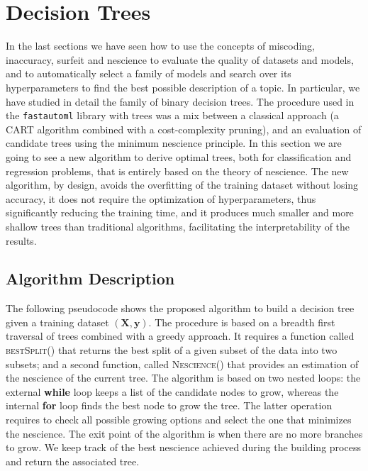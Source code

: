 %
%

\section{Decision Trees}
\label{sec:decision_trees}

In the last sections we have seen how to use the concepts of miscoding, inaccuracy, surfeit and nescience to evaluate the quality of datasets and models, and to automatically select a family of models and search over its hyperparameters to find the best possible description of a topic. In particular, we have studied in detail the family of binary decision trees. The procedure used in the \texttt{fastautoml} library with trees was a mix between a classical approach (a CART algorithm combined with a cost-complexity pruning), and an evaluation of candidate trees using the minimum nescience principle. In this section we are going to see a new algorithm to derive optimal trees, both for classification and regression problems, that is entirely based on the theory of nescience. The new algorithm, by design, avoids the overfitting of the training dataset without losing accuracy, it does not require the optimization of hyperparameters, thus significantly reducing the training time, and it produces much smaller and more shallow trees than traditional algorithms, facilitating the interpretability of the results.

\subsection{Algorithm Description}
\label{sub:tree_algorithm_description}

The following pseudocode shows the proposed algorithm to build a decision tree given a training dataset $(\mathbf{X}, \mathbf{y})$. The procedure is based on a breadth first traversal of trees combined with a greedy approach. It requires a function called \textsc{bestSplit()} that returns the best split of a given subset of the data into two subsets; and a second function, called \textsc{Nescience()} that provides an estimation of the nescience of the current tree. The algorithm is based on two nested loops: the external \textbf{while} loop keeps a list of the candidate nodes to grow, whereas the internal \textbf{for} loop finds the best node to grow the tree. The latter operation requires to check all possible growing options and select the one that minimizes the nescience. The exit point of the algorithm is when there are no more branches to grow. We keep track of the best nescience achieved during the building process and return the associated tree.

